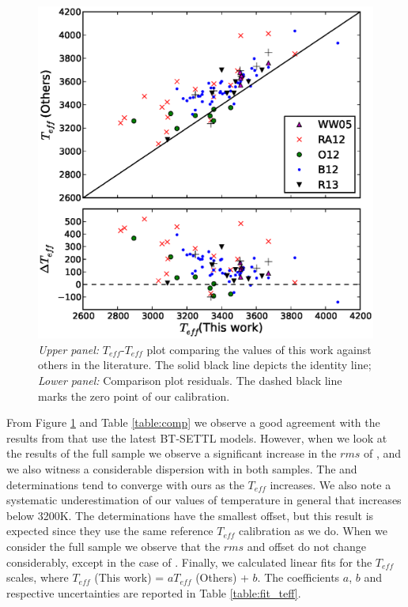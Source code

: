 \documentclass[referee]{aa}
\begin{document}
\begin{figure}[]
\begin{center}
\includegraphics[scale=0.5]{pics/compteffv3.eps}
\end{center}
\caption{\textit{Upper panel:} $T_{eff}$-$T_{eff}$ plot comparing the values of this work against others in the literature. The solid black line depicts the identity line; \textit{Lower panel:} Comparison plot residuals. The dashed black line marks the zero point of our calibration.}
\label{fig:compteff}
\end{figure}

From Figure \ref{fig:compteff} and Table \ref{table:comp} we observe a good agreement with the results from \citet{Rajpurohit-2013a} that use the latest BT-SETTL models. However, when we look at the results of the full sample we observe a significant increase in the $rms$ of \citet{Rajpurohit-2013a}, and we also witness a considerable dispersion with \citet{Rojas-Ayala-2012} in both samples. The \citet{Onehag-2012} and \citet{Boyajian-2012} determinations tend to converge with ours as the $T_{eff}$ increases. 
We also note a systematic underestimation of our values of temperature in general that increases below 3200K. The \citet{Onehag-2012} determinations have the smallest offset, but this result is expected since they use the same reference $T_{eff}$ calibration as we do. When we consider the full sample we observe that the $rms$ and offset do not change considerably, except in the case of \citet{Rajpurohit-2013a}.
Finally, we calculated linear fits for the $T_{eff}$ scales, where $T_{eff}$ (This work) = $aT_{eff}$ (Others) + $b$. The coefficients $a$, $b$ and respective uncertainties are reported in Table \ref{table:fit_teff}.
\end{document}
